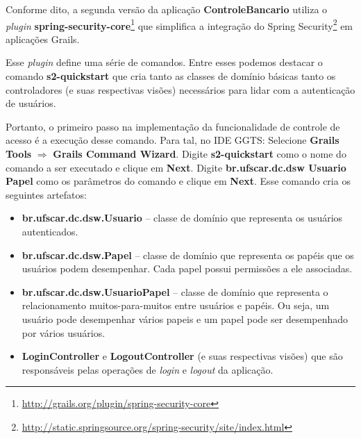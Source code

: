 \vspace{0.3cm}

Conforme dito,  a segunda versão  da aplicação {\bf ControleBancario}  utiliza o
{\it                                 plugin}                                {\bf
  spring-security-core}\footnote{\url{http://grails.org/plugin/spring-security-core}}
que          simplifica         a          integração          do         Spring
Security\footnote{\url{http://static.springsource.org/spring-security/site/index.html}}
em aplicações Grails.  

\vspace{0.3cm}

Esse {\it plugin}  define uma série de comandos. Entre  esses podemos destacar o
comando {\bf s2-quickstart}  que cria tanto as classes  de domínio básicas tanto
os  controladores (e  suas  respectivas  visões) necessários  para  lidar com  a
autenticação de usuários. 

\vspace{0.3cm}

Portanto, o  primeiro passo  na implementação da  funcionalidade de  controle de
acesso é a execução desse comando.  Para tal, no IDE GGTS: Selecione {\bf Grails
  Tools}   $\Longrightarrow$   {\bf  Grails   Command   Wizard}.   Digite   {\bf
  s2-quickstart} como o nome do comando  a ser executado e clique em {\bf Next}.
Digite  {\bf br.ufscar.dc.dsw  Usuario Papel}  como os  parâmetros do  comando e
clique    em     {\bf    Next}.      Esse    comando    cria     os    seguintes
artefatos: 

\vspace{0.5cm}

\begin{itemize}

\item  {\bf br.ufscar.dc.dsw.Usuario}  -- classe  de domínio  que  representa os
  usuários autenticados. 

\vspace{0.3cm}

\item {\bf br.ufscar.dc.dsw.Papel} -- classe de domínio que representa os papéis
  que  os  usuários  podem  desempenhar.  Cada papel  possui  permissões  a  ele
  associadas.  

\vspace{0.5cm}

\item {\bf br.ufscar.dc.dsw.UsuarioPapel} --  classe de domínio que representa o
  relacionamento  muitos-para-muitos  entre  usuários  e papéis.   Ou  seja,  um
  usuário pode  desempenhar vários papeis e  um papel pode  ser desempenhado por
  vários usuários. 

\vspace{0.5cm}

\item {\bf LoginController} e {\bf LogoutController} (e suas respectivas visões)
  que  são  responsáveis  pelas operações  de  {\it  login}  e {\it  logout}  da
  aplicação.

\end{itemize}

